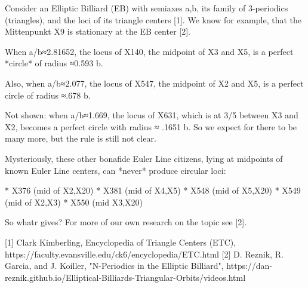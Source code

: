Consider an Elliptic Billiard (EB) with semiaxes a,b, its family of 3-periodics (triangles), and the loci of its triangle centers [1]. We know for example, that the Mittenpunkt X9 is stationary at the EB center [2]. 

When a/b≈2.81652, the locus of X140, the midpoint of X3 and X5, is a perfect *circle* of radius ≈0.593 b.

Also, when a/b≈2.077, the locus of X547, the midpoint of X2 and X5, is a perfect circle of radius ≈.678 b.

Not shown: when a/b≈1.669, the locus of X631, which is at 3/5 between X3 and X2, becomes a perfect circle with radius ≈ .1651 b. So we expect for there to be many more, but the rule is still not clear.

Mysteriously, these other bonafide Euler Line citizens, lying at midpoints of known Euler Line centers, can *never* produce circular loci:

* X376 (mid of X2,X20)
* X381 (mid of X4,X5)
* X548 (mid of X5,X20)
* X549 (mid of X2,X3)
* X550 (mid X3,X20)

So whatr gives? For more of our own research on the topic see [2].

[1] Clark Kimberling, Encyclopedia of Triangle Centers (ETC), https://faculty.evansville.edu/ck6/encyclopedia/ETC.html
[2] D. Reznik, R. Garcia, and J. Koiller, "N-Periodics in the Elliptic Billiard", https://dan-reznik.github.io/Elliptical-Billiards-Triangular-Orbits/videos.html